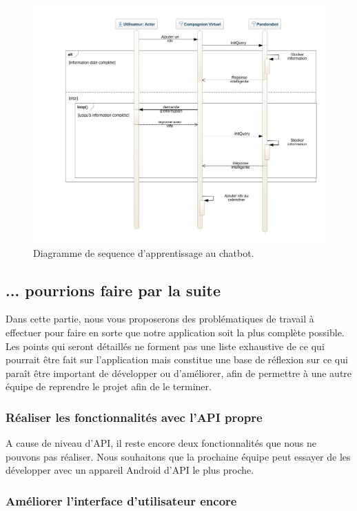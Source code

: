 \begin{figure}[h]
\centering
\includegraphics[width=1\linewidth]{./diagrammes/SequenceDiagram_multi_conversation.jpeg}
\caption{Diagramme de sequence d'apprentissage au chatbot.\label{fig4}}
\end{figure}
\newpage

\subsection{... pourrions faire par la suite}
\indent Dans cette partie, nous vous proposerons des problématiques de travail à effectuer pour faire en sorte que notre application soit la plus complète possible. Les points qui seront détaillés ne forment pas une liste exhaustive de ce qui pourrait être fait sur l'application mais constitue une base de réflexion sur ce qui paraît être important de développer ou d'améliorer, afin de permettre à une autre équipe de reprendre le projet afin de le terminer.

\subsubsection{Réaliser les fonctionnalités avec l'API propre}

\indent A cause de niveau d'API, il reste encore deux fonctionnalités que nous ne pouvons pas réaliser. Nous souhaitons que la prochaine équipe peut essayer de les développer avec un appareil Android d'API le plus proche.

\subsubsection{Améliorer l'interface d'utilisateur encore}

